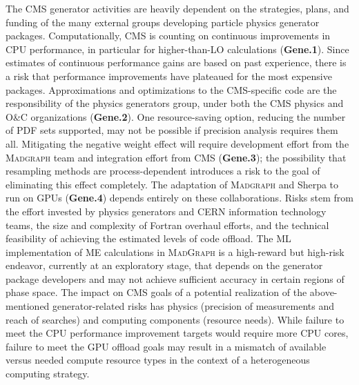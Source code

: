 The CMS generator activities are heavily dependent on the strategies, plans, and funding of the many external groups developing particle physics generator packages. Computationally, CMS is counting on continuous improvements in \gls{CPU} performance, in particular for higher-than-\gls{LO} calculations (\textbf{Gene.1}). Since estimates of continuous performance gains are based on past experience, there is a risk that performance improvements have plateaued for the most expensive packages. Approximations and optimizations to the CMS-specific code are the responsibility of the physics generators group, under both the CMS physics and O\&C organizations (\textbf{Gene.2}). One resource-saving option, reducing the number of \gls{PDF} sets supported, may not be possible if precision analysis requires them all. Mitigating the negative weight effect will require development effort from the \textsc{Madgraph} team and integration effort from CMS (\textbf{Gene.3}); the possibility that resampling methods are process-dependent introduces a risk to the goal of eliminating this effect completely. The adaptation of \textsc{Madgraph} and {\textsc Sherpa} to run on \glspl{GPU} (\textbf{Gene.4}) depends entirely on these collaborations. Risks stem from the effort invested by physics generators and CERN information technology teams, the size and complexity of Fortran overhaul efforts, and the technical feasibility of achieving the estimated levels of code offload. The \gls{ML} implementation of \gls{ME} calculations in \textsc{MadGraph} is a high-reward but high-risk endeavor, currently at an exploratory stage, that depends on the generator package developers and may not achieve sufficient accuracy in certain regions of phase space. The impact on CMS goals of a potential realization of the above-mentioned generator-related risks has physics (precision of measurements and reach of searches) and computing components (resource needs). While failure to meet the \gls{CPU} performance improvement targets would require more \gls{CPU} cores, failure to meet the \gls{GPU} offload goals may result in a mismatch of available versus needed compute resource types in the context of a heterogeneous computing strategy. 

